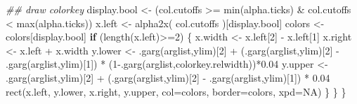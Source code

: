 \documentclass[
  letterpaper,
  DIV=11,
  numbers=noendperiod]{scrartcl}
\newenvironment{Shaded}{\begin{snugshade}}{\end{snugshade}}
\newcommand{\AttributeTok}[1]{\textcolor[rgb]{0.40,0.45,0.13}{#1}}
\newcommand{\ConstantTok}[1]{\textcolor[rgb]{0.56,0.35,0.01}{#1}}
\newcommand{\ControlFlowTok}[1]{\textcolor[rgb]{0.00,0.23,0.31}{\textbf{#1}}}
\newcommand{\DecValTok}[1]{\textcolor[rgb]{0.68,0.00,0.00}{#1}}
\newcommand{\DocumentationTok}[1]{\textcolor[rgb]{0.37,0.37,0.37}{\textit{#1}}}
\newcommand{\FloatTok}[1]{\textcolor[rgb]{0.68,0.00,0.00}{#1}}
\newcommand{\FunctionTok}[1]{\textcolor[rgb]{0.28,0.35,0.67}{#1}}
\newcommand{\NormalTok}[1]{\textcolor[rgb]{0.00,0.23,0.31}{#1}}
\newcommand{\OtherTok}[1]{\textcolor[rgb]{0.00,0.23,0.31}{#1}}
\newcommand{\SpecialCharTok}[1]{\textcolor[rgb]{0.37,0.37,0.37}{#1}}
\newcommand{\StringTok}[1]{\textcolor[rgb]{0.13,0.47,0.30}{#1}}
\begin{document}
\begin{Shaded}
\begin{Highlighting}[]
            \DocumentationTok{\#\# draw colorkey}
\NormalTok{            display.bool }\OtherTok{\textless{}{-}}\NormalTok{ (col.cutoffs }\SpecialCharTok{\textgreater{}=} \FunctionTok{min}\NormalTok{(alpha.ticks) }\SpecialCharTok{\&}
\NormalTok{                             col.cutoffs }\SpecialCharTok{\textless{}} \FunctionTok{max}\NormalTok{(alpha.ticks))}
\NormalTok{            x.left }\OtherTok{\textless{}{-}} \FunctionTok{alpha2x}\NormalTok{( col.cutoffs )[display.bool]}
\NormalTok{            colors }\OtherTok{\textless{}{-}}\NormalTok{ colors[display.bool]}
            \ControlFlowTok{if}\NormalTok{ (}\FunctionTok{length}\NormalTok{(x.left)}\SpecialCharTok{\textgreater{}=}\DecValTok{2}\NormalTok{) \{}
\NormalTok{                x.width }\OtherTok{\textless{}{-}}\NormalTok{ x.left[}\DecValTok{2}\NormalTok{] }\SpecialCharTok{{-}}\NormalTok{ x.left[}\DecValTok{1}\NormalTok{]}
\NormalTok{                x.right }\OtherTok{\textless{}{-}}\NormalTok{ x.left }\SpecialCharTok{+}\NormalTok{ x.width}
\NormalTok{                y.lower }\OtherTok{\textless{}{-}} \FunctionTok{.garg}\NormalTok{(arglist,}\StringTok{\textquotesingle{}ylim\textquotesingle{}}\NormalTok{)[}\DecValTok{2}\NormalTok{] }\SpecialCharTok{+}
\NormalTok{                  (}\FunctionTok{.garg}\NormalTok{(arglist,}\StringTok{\textquotesingle{}ylim\textquotesingle{}}\NormalTok{)[}\DecValTok{2}\NormalTok{] }\SpecialCharTok{{-}} \FunctionTok{.garg}\NormalTok{(arglist,}\StringTok{\textquotesingle{}ylim\textquotesingle{}}\NormalTok{)[}\DecValTok{1}\NormalTok{]) }\SpecialCharTok{*}
\NormalTok{                    (}\DecValTok{1}\SpecialCharTok{{-}}\FunctionTok{.garg}\NormalTok{(arglist,}\StringTok{\textquotesingle{}colorkey.relwidth\textquotesingle{}}\NormalTok{))}\SpecialCharTok{*}\FloatTok{0.04}
\NormalTok{                y.upper }\OtherTok{\textless{}{-}} \FunctionTok{.garg}\NormalTok{(arglist,}\StringTok{\textquotesingle{}ylim\textquotesingle{}}\NormalTok{)[}\DecValTok{2}\NormalTok{] }\SpecialCharTok{+}
\NormalTok{                  (}\FunctionTok{.garg}\NormalTok{(arglist,}\StringTok{\textquotesingle{}ylim\textquotesingle{}}\NormalTok{)[}\DecValTok{2}\NormalTok{] }\SpecialCharTok{{-}} \FunctionTok{.garg}\NormalTok{(arglist,}\StringTok{\textquotesingle{}ylim\textquotesingle{}}\NormalTok{)[}\DecValTok{1}\NormalTok{]) }\SpecialCharTok{*} \FloatTok{0.04}
                \FunctionTok{rect}\NormalTok{(x.left, y.lower, x.right, y.upper,}
                     \AttributeTok{col=}\NormalTok{colors, }\AttributeTok{border=}\NormalTok{colors, }\AttributeTok{xpd=}\ConstantTok{NA}\NormalTok{)}
\NormalTok{            \}}
\NormalTok{        \}}
\NormalTok{    \}}
    

\end{Highlighting}
\end{Shaded}
\end{document}

